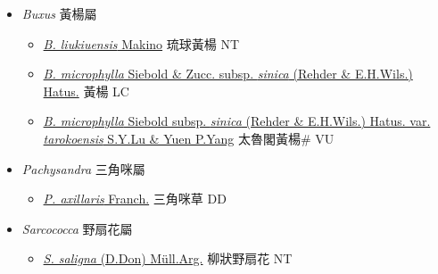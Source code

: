 
  \begin{itemize}
 \item[] \textit{Buxus} 黃楊屬
                    
  \begin{itemize}
        \item[] \href{http://www.theplantlist.org/tpl1.1/search?q=Buxus+liukiuensis}{\textit{B. liukiuensis} Makino}   琉球黃楊 NT
        \item[] \href{http://www.theplantlist.org/tpl1.1/search?q=Buxus+microphylla+subsp.+sinica}{\textit{B. microphylla} Siebold \& Zucc. subsp. \textit{sinica} (Rehder \& E.H.Wils.) Hatus.}   黃楊 LC
        \item[] \href{http://www.theplantlist.org/tpl1.1/search?q=Buxus+microphylla+subsp.+sinica+var.+tarokoensis}{\textit{B. microphylla} Siebold subsp. \textit{sinica} (Rehder \& E.H.Wils.) Hatus. var. \textit{tarokoensis} S.Y.Lu \& Yuen P.Yang}   太魯閣黃楊\# VU
  \end{itemize}
 \item[] \textit{Pachysandra} 三角咪屬
                    
  \begin{itemize}
        \item[] \href{http://www.theplantlist.org/tpl1.1/search?q=Pachysandra+axillaris}{\textit{P. axillaris} Franch.}   三角咪草 DD
  \end{itemize}
 \item[] \textit{Sarcococca} 野扇花屬
                    
  \begin{itemize}
        \item[] \href{http://www.theplantlist.org/tpl1.1/search?q=Sarcococca+saligna}{\textit{S. saligna} (D.Don) Müll.Arg.}   柳狀野扇花 NT
  \end{itemize}
  \end{itemize}
